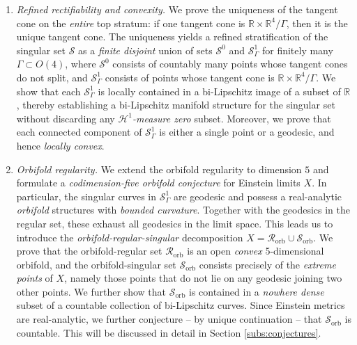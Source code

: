 \documentclass[11pt,reqno]{amsart}
\numberwithin{equation}{section}
\newcommand{\RR}{\mathds{R}}
\newcommand{\cH}{\mathcal{H}}
\newcommand{\cR}{\mathcal{R}}
\newcommand{\cS}{\mathcal{S}}
\theoremstyle{definition}
\theoremstyle{remark}
\begin{document}
\begin{enumerate}
\item \emph{Refined rectifiability and convexity.}  
We prove the uniqueness of the tangent cone on the \emph{entire} top stratum: if one tangent cone is $\RR \times \RR^4/\Gamma$, then it is the unique tangent cone. The uniqueness yields a refined stratification of the singular set $\cS$ as a \emph{finite disjoint} union of sets $\cS^0$ and $\cS^1_{\Gamma}$ for finitely many $\Gamma\subset O(4)$, where $\cS^0$ consists of countably many points whose tangent cones do not split, and $\cS^1_{\Gamma}$ consists of points whose tangent cone is $\mathbb{R}\times \mathbb{R}^4/\Gamma$.
We show that each $\cS^1_{\Gamma}$ is locally contained in a bi-Lipschitz image of a subset of $\mathbb{R}$, thereby establishing a bi-Lipschitz manifold structure for the singular set without discarding any \emph{$\cH^1$-measure zero} subset. Moreover, we prove that each connected component of $\cS^1_{\Gamma}$ is either a single point or a geodesic, and hence \emph{locally convex}.\\



\item \emph{Orbifold regularity.}  
We extend the orbifold regularity to dimension $5$ and formulate a \emph{codimension-five orbifold conjecture} for Einstein limits $X$.  
In particular, the singular curves in $\cS^1_{\Gamma}$ are geodesic and possess a real-analytic \textit{orbifold} structures with \textit{bounded curvature}. Together with the geodesics in the regular set, these exhaust all geodesics in the limit space.
This leads us to introduce the \emph{orbifold-regular-singular} decomposition $X = \cR_{\mathrm{orb}} \cup \cS_{\mathrm{orb}}$. We prove that the orbifold-regular set $\cR_{\mathrm{orb}}$ is an open \textit{convex} 5-dimensional orbifold, and the orbifold-singular set $\cS_{\mathrm{orb}}$ consists precisely of the \emph{extreme points} of $X$, namely those points that do not lie on any geodesic joining two other points. We further show that $\cS_{\mathrm{orb}}$ is contained in a \emph{nowhere dense} subset of a countable collection of bi-Lipschitz curves. Since Einstein metrics are real-analytic, we further conjecture -- by unique continuation -- that $\cS_{\mathrm{orb}}$ is countable. This will be discussed in detail in Section \ref{subs:conjectures}. 


\end{enumerate}
\end{document}
